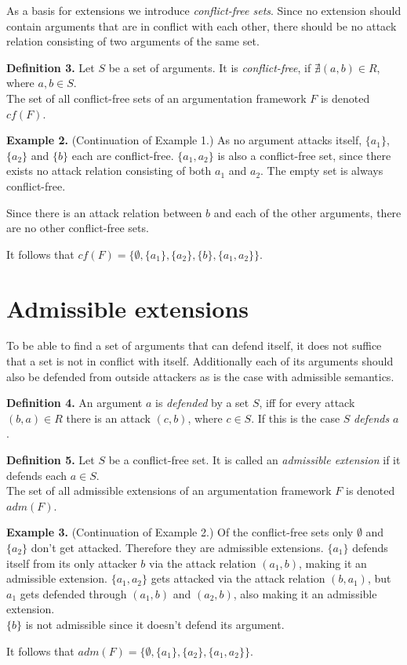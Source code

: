 \documentclass[draft,final]{vutinfth} %
\newcommand{\hl}{\par\vspace{6pt}} %
\newcommand{\cl}{\par\vspace{12pt}} %
\begin{document}
As a basis for extensions we introduce \emph{conflict-free sets}. Since no extension should contain arguments that are in conflict with each other, there should be no attack relation consisting of two arguments of the same set.\cl

\textbf{Definition 3.} Let $S$ be a set of arguments. It is \emph{conflict-free}, if $\nexists (a,b)\in R$, where $a,b\in S$.\\
The set of all conflict-free sets of an argumentation framework $F$ is denoted $cf(F)$.\cl

\textbf{Example 2.} (Continuation of Example 1.) As no argument attacks itself, $\{a_1\}$, $\{a_2\}$ and $\{b\}$ each are conflict-free. $\{a_1,a_2\}$ is also a conflict-free set, since there exists no attack relation consisting of both $a_1$ and $a_2$. The empty set is always conflict-free.\hl
Since there is an attack relation between $b$ and each of the other arguments, there are no other conflict-free sets.\hl
It follows that $cf(F)=\{\emptyset,\{a_1\},\{a_2\},\{b\},\{a_1,a_2\}\}$.\cl

\section{Admissible extensions}

To be able to find a set of arguments that can defend itself, it does not suffice that a set is not in conflict with itself. Additionally each of its arguments should also be defended from outside attackers as is the case with admissible semantics.\hl

\textbf{Definition 4.} An argument $a$ is \emph{defended} by a set $S$, iff for every attack $(b,a)\in R$ there is an attack $(c,b)$, where $c\in S$. If this is the case $S$ \emph{defends} $a$.\cl

\textbf{Definition 5.} Let $S$ be a conflict-free set. It is called an \emph{admissible extension} if it defends each $a\in S$.\\
The set of all admissible extensions of an argumentation framework $F$ is denoted $adm(F)$.\cl

\textbf{Example 3.} (Continuation of Example 2.) Of the conflict-free sets only \(\emptyset\) and $\{a_2\}$ don't get attacked. Therefore they are admissible extensions. $\{a_1\}$ defends itself from its only attacker $b$ via the attack relation $(a_1,b)$, making it an admissible extension. $\{a_1,a_2\}$ gets attacked via the attack relation $(b,a_1)$, but $a_1$ gets defended through $(a_1,b)$ and $(a_2,b)$, also making it an admissible extension.\\
$\{b\}$ is not admissible since it doesn't defend its argument.\hl
It follows that $adm(F)=\{\emptyset,\{a_1\},\{a_2\},\{a_1,a_2\}\}$.\cl
\end{document}
